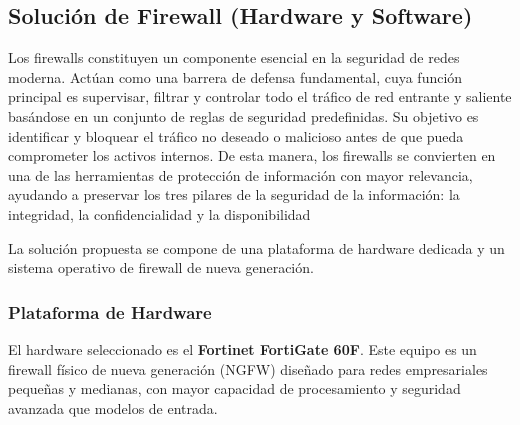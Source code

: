 \subsection{Solución de Firewall (Hardware y Software)}
Los firewalls constituyen un componente esencial en la seguridad de redes moderna. Actúan como una barrera de defensa fundamental, cuya función principal es supervisar, filtrar y controlar todo el tráfico de red entrante y saliente basándose en un conjunto de reglas de seguridad predefinidas. Su objetivo es identificar y bloquear el tráfico no deseado o malicioso antes de que pueda comprometer los activos internos. De esta manera, los firewalls se convierten en una de las herramientas de protección de información con mayor relevancia, ayudando a preservar los tres pilares de la seguridad de la información: la integridad, la confidencialidad y la disponibilidad \parencite{MoraBandera2020}

La solución propuesta se compone de una plataforma de hardware dedicada y un sistema operativo de firewall de nueva generación.

\subsubsection{Plataforma de Hardware}
El hardware seleccionado es el \textbf{Fortinet FortiGate 60F}. Este equipo es un firewall físico de nueva generación (NGFW) diseñado para redes empresariales pequeñas y medianas, con mayor capacidad de procesamiento y seguridad avanzada que modelos de entrada.

